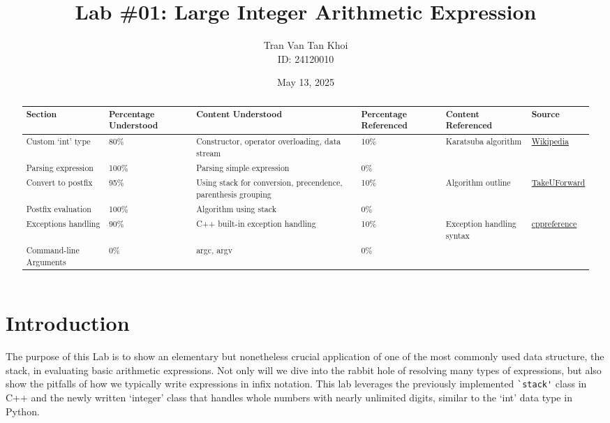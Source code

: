 \documentclass{article}
\author{Tran Van Tan Khoi \\ ID: 24120010}
\date{May 13, 2025}
\title{Lab \#01: Large Integer Arithmetic Expression}
\begin{document}
\maketitle

\renewcommand\abstractname{Attributions and References}
\begin{abstract}
    \noindent
    \begin{tabularx}{\linewidth}{ | X | X | X | X | X | X |} \hline
        Section & \raggedright Percentage Understood & \raggedright Content Understood & \raggedright Percentage Referenced & \raggedright Content Referenced & Source \\ \hline\hline
        \raggedright Custom `int' type & 80\% & \raggedright Constructor, operator overloading, data stream & 10\% & \raggedright Karatsuba algorithm & \href{https://en.wikipedia.org/wiki/Karatsuba_algorithm}{Wikipedia} \\ \hline
        \raggedright Parsing expression & 100\% & Parsing simple expression & 0\% & & \\ \hline
        \raggedright Convert to postfix & 95\% & \raggedright Using stack for conversion, precendence, parenthesis grouping & 10\% & Algorithm outline & \href{https://takeuforward.org/data-structure/infix-to-postfix/}{TakeUForward} \\ \hline
        \raggedright Postfix evaluation & 100\% & Algorithm using stack & 0\% & & \\ \hline
        \raggedright Exceptions handling & 90\% & C++ built-in exception handling & 10\% & Exception handling syntax & \href{https://en.cppreference.com/w/cpp/language/catch}{cppreference} \\ \hline
        \raggedright Command-line Arguments & 0\% & argc, argv & 0\% & & \\ \hline
    \end{tabularx}
\end{abstract}

\section{Introduction}
\label{Introduction}

The purpose of this Lab is to show an elementary but nonetheless crucial application of one of the most commonly used data structure, the stack, in evaluating basic arithmetic expressions. Not only will we dive into the rabbit hole of resolving many types of expressions, but also show the pitfalls of how we typically write expressions in infix notation. This lab leverages the previously implemented \lstinline{`stack'} class in C++ and the newly written `integer' class that handles whole numbers with nearly unlimited digits, similar to the `int' data type in Python.
\end{document}
